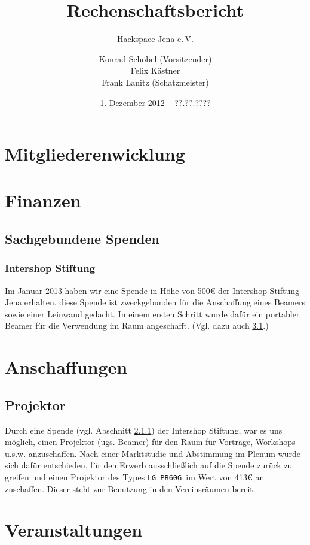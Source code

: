 \documentclass[10pt,DIV16]{scrartcl}
\title{Rechenschaftsbericht}
\subtitle{Hackspace Jena e.\,V.}
\author{%
	Konrad Schöbel (Vorsitzender)\\
	Felix Kästner\\
	Frank Lanitz (Schatzmeister)
}
\date{1. Dezember 2012 -- ??.??.????}
\begin{document}
\maketitle{}

\tableofcontents{}

\newpage{}

\section{Mitgliederenwicklung}
\section{Finanzen}

\subsection{Sachgebundene Spenden}
\subsubsection{Intershop Stiftung}
\label{sec:iss-spende}
Im Januar 2013 haben wir eine Spende in Höhe von 500\euro{} der Intershop
Stiftung Jena erhalten. diese Spende ist zweckgebunden für die
Anschaffung eines Beamers sowie einer Leinwand gedacht. In einem
ersten Schritt wurde dafür ein portabler Beamer für die Verwendung
im Raum angeschafft. (Vgl. dazu auch \ref{sec:beamerkauf}.)

\section{Anschaffungen}

\subsection{Projektor}
\label{sec:beamerkauf}

Durch eine Spende (vgl. Abschnitt \ref{sec:iss-spende}) der
Intershop Stiftung, war es uns möglich, einen Projektor (ugs. Beamer) für den Raum
für Vorträge, Workshops u.s.w. anzuschaffen. Nach einer Marktstudie
und Abstimmung im Plenum wurde sich dafür entschieden, für den
Erwerb ausschließlich auf die Spende zurück zu greifen und einen
Projektor des Types \texttt{LG PB60G }im Wert von 413\euro{} an
zuschaffen. Dieser steht zur Benutzung in den Vereinsräumen bereit.

\section{Veranstaltungen}
\end{document}
